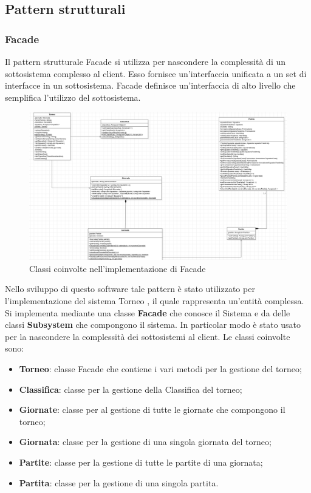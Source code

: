 \documentclass[12pt,a4paper]{article}
\begin{document}
\subsection{Pattern strutturali}
\subsubsection{Facade}
Il pattern strutturale Facade si utilizza per nascondere la complessità di un sottosistema complesso al client. Esso fornisce un'interfaccia unificata a un set di interfacce in un sottosistema. Facade definisce un'interfaccia di alto livello che semplifica l'utilizzo del sottosistema.
\begin{figure}[h]
\centering
\includegraphics[width=16 cm ,keepaspectratio]{Facade.png}
\caption{Classi coinvolte nell'implementazione di Facade}
\end{figure}
\newline
Nello sviluppo di questo software tale pattern è stato utilizzato per l'implementazione del sistema Torneo , il quale rappresenta un'entità complessa. Si implementa mediante una classe \textbf{Facade} che conosce il Sistema e da delle classi \textbf{Subsystem} che compongono il sistema. In particolar modo è stato usato per la nascondere la complessità dei sottosistemi al client. Le classi coinvolte sono:
\begin{itemize}
\item \textbf{Torneo}: classe Facade che contiene i vari metodi per la gestione del torneo;
\item \textbf{Classifica}: classe per la gestione della Classifica del torneo;
\item \textbf{Giornate}: classe per al gestione di tutte le giornate che compongono il torneo;
\item \textbf{Giornata}: classe per la gestione di una singola giornata del torneo;
\item \textbf{Partite}: classe per la gestione di tutte le partite di una giornata;
\item \textbf{Partita}: classe per la gestione di una singola partita.
\end{itemize}
\newpage
\end{document}
